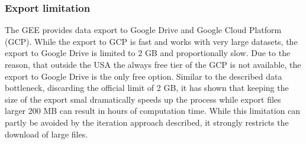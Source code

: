 \documentclass[12pt,twoside,a4paper,final]{report}
\begin{document}
\subsubsection{Export limitation}

The GEE provides data export to Google Drive and Google Cloud Platform (GCP). While the export to GCP is fast and works with very large datasets, the export to Google Drive is limited to 2 GB and proportionally slow. Due to the reason, that outside the USA the always free tier of the GCP is not available, the export to Google Drive is the only free option. Similar to the described data bottleneck, discarding the official limit of 2 GB, it has shown that keeping the size of the export smal dramatically speeds up the process while export files larger 200 MB can result in hours of computation time. While this limitation can partly be avoided by the iteration approach described, it strongly restricts the download of large files.



%
\printbibliography







\printindex


\end{document}
